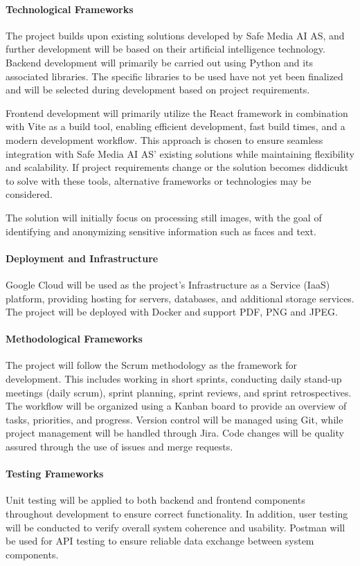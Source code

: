 \paragraph{Technological Frameworks}
The project builds upon existing solutions developed by Safe Media AI AS, and further development will be based on their artificial intelligence technology. Backend development will primarily be carried out using Python and its associated libraries. The specific libraries to be used have not yet been finalized and will be selected during development based on project requirements.

Frontend development will primarily utilize the React framework in combination with Vite as a build tool, enabling efficient development, fast build times, and a modern development workflow. This approach is chosen to ensure seamless integration with Safe Media AI AS' existing solutions while maintaining flexibility and scalability. If project requirements change or the solution becomes diddicukt to solve with these tools, alternative frameworks or technologies may be considered.

The solution will initially focus on processing still images, with the goal of identifying and anonymizing sensitive information such as faces and text.

\paragraph{Deployment and Infrastructure}
Google Cloud will be used as the project's Infrastructure as a Service (IaaS) platform, providing hosting for servers, databases, and additional storage services. The project will be deployed with Docker and support PDF, PNG and JPEG.

\paragraph{Methodological Frameworks}
The project will follow the Scrum methodology as the framework for development. This includes working in short sprints, conducting daily stand-up meetings (daily scrum), sprint planning, sprint reviews, and sprint retrospectives. The workflow will be organized using a Kanban board to provide an overview of tasks, priorities, and progress. Version control will be managed using Git, while project management will be handled through Jira. Code changes will be quality assured through the use of issues and merge requests.

\paragraph{Testing Frameworks}
Unit testing will be applied to both backend and frontend components throughout development to ensure correct functionality. In addition, user testing will be conducted to verify overall system coherence and usability. Postman will be used for API testing to ensure reliable data exchange between system components.

